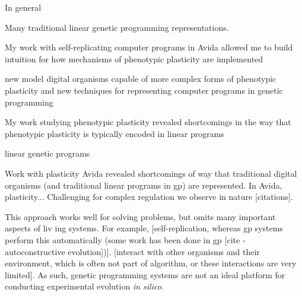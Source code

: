 
In general

Many traditional linear genetic programming representations.

My work with self-replicating computer programs in Avida allowed me to build intuition for how mechanisms of phenotypic plasticity are implemented 

new model digital organisms capable of more complex forms of phenotypic plasticity
and new techniques for representing computer programs in genetic programming

My work studying phenotypic plasticity revealed shortcomings in the way that phenotypic plasticity is typically encoded in linear programs 

linear genetic programs 

Work with plasticity Avida revealed shortcomings of way that traditional digital organisms (and traditional linear programs in gp) are represented. 
In Avida, plasticity...
Challenging for complex regulation we observe in nature [citations].


This approach works well for solving problems, but omits many important aspects of liv ing systems.
For example,
[self-replication, whereas gp systems perform this automatically (some work has been done in gp [cite - autoconstructive evolution])].
[interact with other organisms and their environment, which is often not part of algorithm, or these interactions are very limited].
As such, genetic programming systems are not an ideal platform for conducting experimental evolution \textit{in silico}. 




